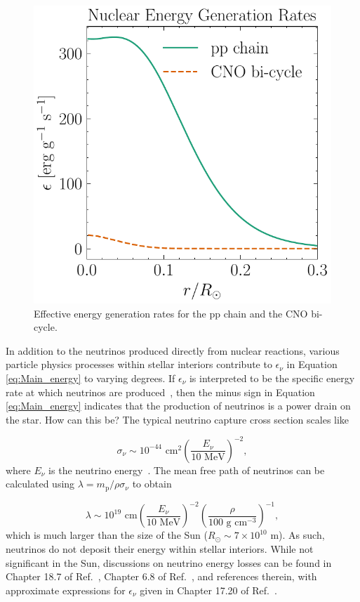 \documentclass[12pt]{article}
\newcommand{\bigparenthesis}[1]{\left(#1\right)}
\begin{document}
\begin{figure}
    \centering
    \includegraphics[width=0.5\linewidth]{Solar Model Images/energy_gen.pdf}
    \caption{Effective energy generation rates for the pp chain and the CNO bi-cycle.}
    \label{fig:energy_gen}
\end{figure}

In addition to the neutrinos produced directly from nuclear reactions, various particle physics processes within stellar interiors contribute to $\epsilon_\nu$ in Equation \ref{eq:Main_energy} to varying degrees. If $\epsilon_\nu$ is interpreted to be the specific energy rate at which neutrinos are produced~\cite{HK_book}, then the minus sign in Equation \ref{eq:Main_energy} indicates that the production of neutrinos is a power drain on the star. How can this be? The typical neutrino capture cross section scales like

\begin{equation}
    \sigma_\nu \sim 10^{-44} \text{ cm}^2 \bigparenthesis{\frac{E_\nu}{10 \text{ MeV}}}^{-2}, 
\end{equation}
%
where $E_\nu$ is the neutrino energy~\cite{KWW_book}. The mean free path of neutrinos can be calculated using $\lambda = m_\mathrm{p}/\rho\sigma_\nu$ to obtain

\begin{equation}
    \lambda \sim 10^{19} \text{ cm} \bigparenthesis{\frac{E_\nu}{10 \text{ MeV}}}^{-2} \bigparenthesis{\frac{\rho}{100 \text{ g cm}^{-3} }}^{-1},
\end{equation}
%
which is much larger than the size of the Sun ($R_\odot \sim 7 \times 10^{10}$ m). As such, neutrinos do not deposit their energy within stellar interiors. While not significant in the Sun, discussions on neutrino energy losses can be found in Chapter 18.7 of Ref.~\cite{KWW_book}, Chapter 6.8 of Ref.~\cite{HK_book}, and references therein, with approximate expressions for $\epsilon_\nu$ given in Chapter 17.20 of Ref.~\cite{Cox_Giuli_vol1}.
\end{document}
